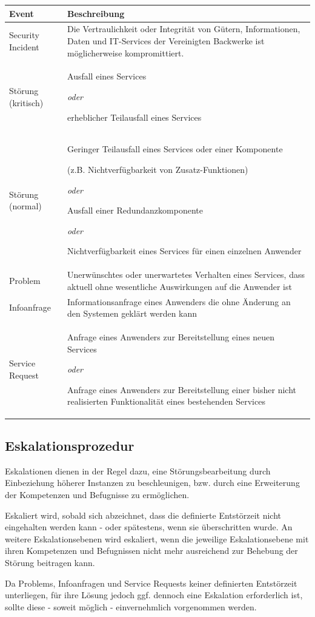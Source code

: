 \documentclass[]{article}
\begin{document}
\begin{longtable}{lp{6cm}}
\toprule
Event & Beschreibung\tabularnewline
\midrule
Security Incident & Die Vertraulichkeit oder Integrität von Gütern,
Informationen, Daten und IT-Services der Vereinigten Backwerke ist
möglicherweise kompromittiert.\tabularnewline
Störung (kritisch) & Ausfall eines Services

\emph{oder}

erheblicher Teilausfall eines Services\tabularnewline
Störung (normal) & Geringer Teilausfall eines Services oder einer
Komponente

(z.B. Nichtverfügbarkeit von Zusatz-Funktionen)

\emph{oder}

Ausfall einer Redundanzkomponente

\emph{oder}

Nichtverfügbarkeit eines Services für einen einzelnen
Anwender\tabularnewline
Problem & Unerwünschtes oder unerwartetes Verhalten eines Services, dass
aktuell ohne wesentliche Auswirkungen auf die Anwender
ist\tabularnewline
Infoanfrage & Informationsanfrage eines Anwenders die ohne Änderung an
den Systemen geklärt werden kann\tabularnewline
Service Request & Anfrage eines Anwenders zur Bereitstellung eines neuen
Services

\emph{oder}

Anfrage eines Anwenders zur Bereitstellung einer bisher nicht
realisierten Funktionalität eines bestehenden Services\tabularnewline
\bottomrule
\end{longtable}

\subsection{Eskalationsprozedur}\label{eskalationsprozedur}

Eskalationen dienen in der Regel dazu, eine Störungsbearbeitung durch
Einbeziehung höherer Instanzen zu beschleunigen, bzw. durch eine
Erweiterung der Kompetenzen und Befugnisse zu ermöglichen.

Eskaliert wird, sobald sich abzeichnet, dass die definierte Entstörzeit
nicht eingehalten werden kann - oder spätestens, wenn sie überschritten
wurde. An weitere Eskalationsebenen wird eskaliert, wenn die jeweilige
Eskalationsebene mit ihren Kompetenzen und Befugnissen nicht mehr
ausreichend zur Behebung der Störung beitragen kann.

Da Problems, Infoanfragen und Service Requests keiner definierten
Entstörzeit unterliegen, für ihre Lösung jedoch ggf. dennoch eine
Eskalation erforderlich ist, sollte diese - soweit möglich -
einvernehmlich vorgenommen werden.
\end{document}
